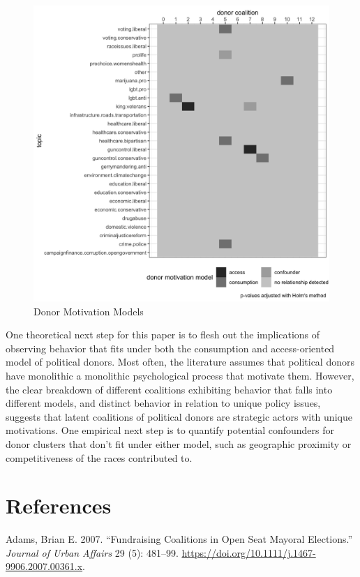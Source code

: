 \documentclass[12pt,]{article}
\begin{document}
\begin{figure}
\centering
\includegraphics{../tables_and_figures/aejmc_abstract_1.jpg}
\caption{Donor Motivation Models}
\end{figure}

One theoretical next step for this paper is to flesh out the
implications of observing behavior that fits under both the consumption
and access-oriented model of political donors. Most often, the
literature assumes that political donors have monolithic a monolithic
psychological process that motivate them. However, the clear breakdown
of different coalitions exhibiting behavior that falls into different
models, and distinct behavior in relation to unique policy issues,
suggests that latent coalitions of political donors are strategic actors
with unique motivations. One empirical next step is to quantify
potential confounders for donor clusters that don't fit under either
model, such as geographic proximity or competitiveness of the races
contributed to.

\hypertarget{references}{%
\section*{References}\label{references}}

\hypertarget{refs}{}
\leavevmode\hypertarget{ref-adams2016}{}%
Adams, Brian E. 2007. ``Fundraising Coalitions in Open Seat Mayoral
Elections.'' \emph{Journal of Urban Affairs} 29 (5): 481--99.
\url{https://doi.org/10.1111/j.1467-9906.2007.00361.x}.
\end{document}
